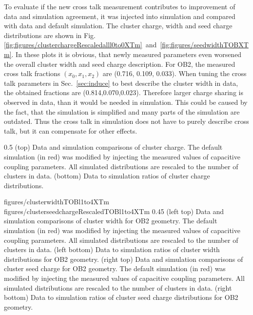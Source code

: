To evaluate if the new cross talk measurement contributes to improvement of data and simulation agreement, it was injected into simulation and compared with data and default simulation. The cluster charge, width and seed charge distributions are shown in Fig.\ref{fig:figures/clusterchargeRescaledalll0to0XTm}~and~\ref{fig:figures/seedwidthTOBXTm}. In these plots it is obvious, that newly measured parameters even worsened the overall cluster width and seed charge description. For OB2, the measured cross talk fractions $(x_{0}, x_{1}, x_{2})$ are (0.716, 0.109, 0.033). When tuning the cross talk parameters in Sec.~\ref{sec:induce} to best describe the cluster width in data, the obtained fractions are (0.814,0.070,0.023). Therefore larger charge sharing is observed in data, than it would be needed in simulation. This could be caused by the fact, that the simulation is simplified and many parts of the simulation are outdated. Thus the cross talk in simulation does not have to purely describe cross talk, but it can compensate for other effects. 


                 {0.5}       %
                 { (top) Data and simulation comparisons of cluster charge. The default simulation (in red) was modified by injecting the measured values of capacitive coupling parameters. All simulated distributions are rescaled to the number of clusters in data. (bottom) Data to simulation ratios of cluster charge distributions. }

                 {figures/clusterwidthTOBl1to4XTm}
                 {figures/clusterseedchargeRescaledTOBl1to4XTm} %
                 {0.45}       %
                 {(left top) Data and simulation comparisons of cluster width for OB2 geometry. The default simulation (in red) was modified by injecting the measured values of capacitive coupling parameters. All simulated distributions are rescaled to the number of clusters in data. (left bottom) Data to simulation ratios of cluster width distributions for OB2 geometry. (right top) Data and simulation comparisons of cluster seed charge for OB2 geometry. The default simulation (in red) was modified by  injecting the measured values of capacitive coupling parameters. All simulated distributions are rescaled to the number of clusters in data. (right bottom) Data to simulation ratios of cluster seed charge distributions for OB2 geometry. }

